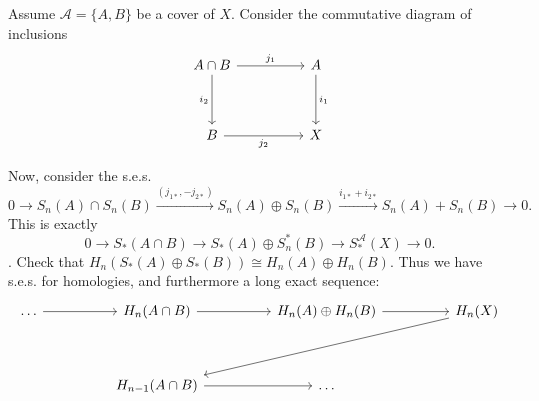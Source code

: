 \begin{proposition}
	\label{prop:MayerVietorsequence}
	
Assume $\mathcal{A} = \{A, B\} $ be a cover of $X$. Consider the commutative diagram of inclusions
\[\begin{tikzcd}
	{A \cap B} && A \\
	\\
	B && X
	\arrow["{j_1}", from=1-1, to=1-3]
	\arrow["{i_1}", from=1-3, to=3-3]
	\arrow["{i_2}"', from=1-1, to=3-1]
	\arrow["{j_2}"', from=3-1, to=3-3]
\end{tikzcd}\]

Now, consider the s.e.s.
\[
	0 \to S_n(A) \cap S_n(B) \xrightarrow{(j_{1 *}, - j_{2 *})}  S_n(A) \oplus S_n(B) \xrightarrow{i_{1 *} + i_{2 *}} S_n(A) + S_n(B) \to  0
.\] 
This is exactly
\[
	0 \to S_*(A \cap B) \to S_*(A)\oplus S_n^*(B) \to S_*^{\mathcal{A}}(X) \to  0
.\] 
. Check that $H_n(S_*(A) \oplus S_*(B)) \cong H_n(A) \oplus H_n(B)$. Thus we have s.e.s. for homologies, and furthermore a long exact sequence:
\[\begin{tikzcd}
	\dots && {H_n(A \cap B)} && {H_n(A) \oplus H_n(B)} && {H_n(X)} \\
	\\
	&& {H_{n -1}(A \cap B)} && \dots
	\arrow[from=1-1, to=1-3]
	\arrow[from=1-3, to=1-5]
	\arrow[from=1-5, to=1-7]
	\arrow[from=1-7, to=3-3]
	\arrow[from=3-3, to=3-5]
\end{tikzcd}\]
\end{proposition}





